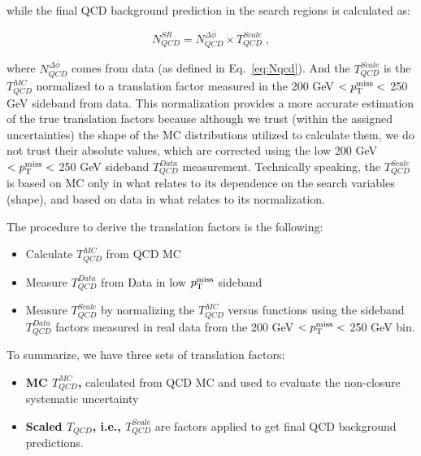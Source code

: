 while the final QCD background prediction in the search regions is calculated as:

\begin{equation}
N^{SR}_{QCD} = N^{\Delta\bar{\phi}}_{QCD} \times T_{QCD}^{Scale} \; ,
\label{eq:QCDformula}
\end{equation}

where $N^{\Delta\bar{\phi}}_{QCD}$ comes from data (as defined in Eq.~\ref{eq:Nqcd}). And the $T_{QCD}^{Scale}$ is the
$T_{QCD}^{MC}$ normalized to a translation factor measured in the 200 GeV $<p^{\rm miss}_{\rm T}<$ 250 GeV sideband from data.
This normalization provides a more accurate
estimation of the true translation factors because although we trust (within the assigned uncertainties)
the shape of the MC distributions utilized to calculate them, we do not
trust their absolute values, which are corrected using the low 
200 GeV $<p^{\rm miss}_{\rm T}<$ 250 GeV sideband $T_{QCD}^{Data}$ measurement. Technically 
speaking, the $T_{QCD}^{Scale}$ is based on MC only in what relates to 
its dependence on the search variables (shape), and based on data in what
relates to its normalization.

The procedure to derive the translation factors is the following:
\begin{itemize}
\item Calculate $T_{QCD}^{MC}$ from QCD MC
\item Measure $T_{QCD}^{Data}$ from Data in low $p^{\rm miss}_{\rm T}$ sideband
\item Measure $T_{QCD}^{Scale}$ by normalizing the $T_{QCD}^{MC}$ versus \MET functions using the sideband 
$T_{QCD}^{Data}$ factors measured in real data from the 
200 GeV $<p^{\rm miss}_{\rm T}<$ 250 GeV bin.
\end{itemize}

To summarize, we have three sets of translation factors: 
\begin{itemize}
\item \textbf{MC $T_{QCD}^{MC}$,} calculated from QCD MC and
used to evaluate the non-closure systematic uncertainty
\item \textbf{Scaled $T_{QCD}$, i.e., $T_{QCD}^{Scale}$} are factors 
applied to get final QCD background predictions.
\end{itemize}

